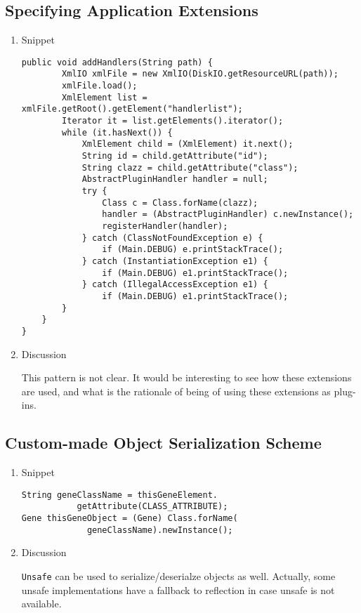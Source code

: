 \documentclass{usiinfdocprop}
\begin{document}
\subsection{Specifying Application Extensions}
\label{sec:orgd6a5687}
\begin{enumerate}
\item Snippet
\label{sec:orgc41351f}

\lstset{language=java,label= ,caption= ,captionpos=b,numbers=none}
\begin{lstlisting}
public void addHandlers(String path) {
        XmlIO xmlFile = new XmlIO(DiskIO.getResourceURL(path));
        xmlFile.load();
        XmlElement list = xmlFile.getRoot().getElement("handlerlist");
        Iterator it = list.getElements().iterator();
        while (it.hasNext()) {
            XmlElement child = (XmlElement) it.next();
            String id = child.getAttribute("id");
            String clazz = child.getAttribute("class");
            AbstractPluginHandler handler = null;
            try {
                Class c = Class.forName(clazz);
                handler = (AbstractPluginHandler) c.newInstance();
                registerHandler(handler);
            } catch (ClassNotFoundException e) {
                if (Main.DEBUG) e.printStackTrace();
            } catch (InstantiationException e1) {
                if (Main.DEBUG) e1.printStackTrace();
            } catch (IllegalAccessException e1) {
                if (Main.DEBUG) e1.printStackTrace();
        }
    }
}
\end{lstlisting}

\item Discussion
\label{sec:org642a864}

This pattern is not clear.
It would be interesting to see how these extensions are used,
and what is the rationale of being of using these extensions as plug-ins.
\end{enumerate}

\subsection{Custom-made Object Serialization Scheme}
\label{sec:org4044068}
\begin{enumerate}
\item Snippet
\label{sec:org40082df}

\lstset{language=java,label= ,caption= ,captionpos=b,numbers=none}
\begin{lstlisting}
String geneClassName = thisGeneElement.
           getAttribute(CLASS_ATTRIBUTE);
Gene thisGeneObject = (Gene) Class.forName(
             geneClassName).newInstance();
\end{lstlisting}

\item Discussion
\label{sec:org770759e}

\texttt{Unsafe} can be used to serialize/deserialze objects as well.
Actually, some unsafe implementations have a fallback to reflection in case
unsafe is not available.
\end{enumerate}
\end{document}

